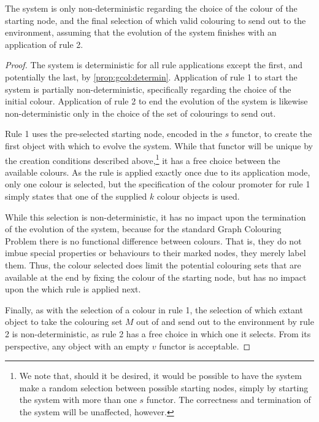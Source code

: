 \begin{proposition}\label{prop:gcol:nondet}
The system is only non-deterministic regarding the choice of the colour of the starting node, and the final selection of which valid colouring to send out to the environment, assuming that the evolution of the system finishes with an application of rule 2.
\end{proposition}

\begin{proof}
The system is deterministic for all rule applications except the first, and potentially the last, by \cref{prop:gcol:determin}.  Application of rule 1 to start the system is partially non-deterministic, specifically regarding the choice of the initial colour.  Application of rule 2 to end the evolution of the system is likewise non-deterministic only in the choice of the set of colourings to send out.

Rule 1 uses the pre-selected starting node, encoded in the \(s\) functor, to create the first \bo{} object with which to evolve the system.  While that functor will be unique by the creation conditions described above,\footnote{We note that, should it be desired, it would be possible to have the system make a random selection between possible starting nodes, simply by starting the system with more than one \(s\) functor.  The correctness and termination of the system will be unaffected, however.} it has a free choice between the available colours.  As the rule is applied exactly once due to its application mode, only one colour is selected, but the specification of the colour promoter for rule 1 simply states that one of the supplied \(k\) colour objects is used.

While this selection is non-deterministic, it has no impact upon the termination of the evolution of the system, because for the standard Graph Colouring Problem there is no functional difference between colours.  That is, they do not imbue special properties or behaviours to their marked nodes, they merely label them.  Thus, the colour selected does limit the potential colouring sets that are available at the end by fixing the colour of the starting node, but has no impact upon the which rule is applied next.

Finally, as with the selection of a colour in rule 1, the selection of which extant \bo{} object to take the colouring set \(M\) out of and send out to the environment by rule 2 is non-deterministic, as rule 2 has a free choice in which one it selects.  From its perspective, any \bo{} object with an empty \(v\) functor is acceptable.
\end{proof}

